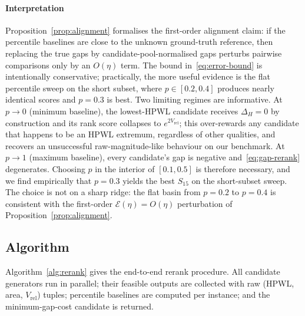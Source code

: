 \documentclass[nolineno]{ieeeaccess}
\begin{document}
\paragraph*{Interpretation}
Proposition~\ref{prop:alignment} formalises the first-order alignment
claim: if the percentile baselines are close to the unknown
ground-truth reference, then replacing the true gaps by
candidate-pool-normalised gaps perturbs pairwise comparisons only by
an $O(\eta)$ term. The bound in~\eqref{eq:error-bound} is intentionally
conservative; practically, the more useful evidence is the flat
percentile sweep on the short subset, where $p \in [0.2,0.4]$ produces
nearly identical scores and $p=0.3$ is best. Two limiting regimes are
informative. At $p\to 0$ (minimum baseline),
the lowest-HPWL candidate receives $\Delta_H = 0$ by construction and
its rank score collapses to $e^{2V_{\text{rel}}}$; this over-rewards any
candidate that happens to be an HPWL extremum, regardless of other
qualities, and recovers an unsuccessful raw-magnitude-like behaviour
on our benchmark. At $p\to 1$ (maximum baseline), every candidate's
gap is negative and~\eqref{eq:gap-rerank} degenerates. Choosing $p$ in
the interior of $[0.1, 0.5]$ is therefore necessary, and we find
empirically that $p=0.3$ yields the best $S_{15}$ on the
short-subset sweep. The choice is not on a sharp ridge: the flat basin
from $p=0.2$ to $p=0.4$ is consistent with the first-order
$\mathcal{E}(\eta)=O(\eta)$ perturbation of
Proposition~\ref{prop:alignment}.

\subsection{Algorithm}
\label{sec:rerank-algorithm}

Algorithm~\ref{alg:rerank} gives the end-to-end rerank procedure. All
candidate generators run in parallel; their feasible outputs are
collected with raw (HPWL, area, $V_{\text{rel}}$) tuples; percentile
baselines are computed per instance; and the minimum-gap-cost
candidate is returned.
\end{document}
